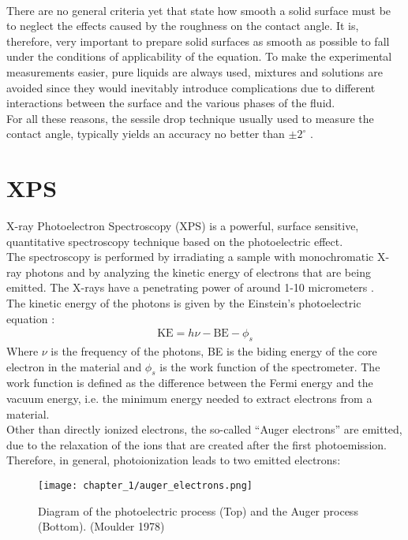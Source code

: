 \\
There are no general criteria yet that state how smooth a solid surface must be to neglect the effects caused by the roughness on the contact angle. It is, therefore, very important to prepare solid surfaces as smooth as possible to fall under the conditions of applicability of the equation. To make the experimental measurements easier, pure liquids are always used, mixtures and solutions are avoided since they would inevitably introduce complications due to different interactions between the surface and the various phases of the fluid.
\\
For all these reasons, the sessile drop technique usually used to measure the contact angle, typically yields an accuracy no better than $\pm 2^\circ$ \cite{kwokContactAngleMeasurement1999}.

\section{XPS}
\label{sec:xps}
X-ray Photoelectron Spectroscopy (XPS) is a powerful, surface sensitive, quantitative spectroscopy technique based on the photoelectric effect.
\\
The spectroscopy is performed by irradiating a sample with monochromatic X-ray photons and by analyzing the kinetic energy of electrons that are being emitted. The X-rays have a penetrating power of around 1-10 micrometers \cite{moulderHandbookXrayPhotoelectron1992}.
\\
The kinetic energy of the photons is given by the Einstein's photoelectric equation \cite{einsteinHeuristicPointView1967}:
\begin{align}
    \mathrm{KE}=h\nu-\mathrm{BE}-\phi_s \label{eq:einstein_ph_eq}
\end{align}
Where $\nu$ is the frequency of the photons, BE is the biding energy of the core electron in the material and $\phi_s$ is the work function of the spectrometer. The work function is defined as the difference between the Fermi energy and the vacuum energy, i.e. the minimum energy needed to extract electrons from a material. 
\\
Other than directly ionized electrons, the so-called “Auger electrons” \cite{augerAugerEffect1975} are emitted, due to the relaxation of the ions that are created after the first photoemission. Therefore, in general, photoionization leads to two emitted electrons:
\begin{figure}[H]
    \centering
    \texttt{[image: chapter\_1/auger\_electrons.png]}
    \vspace*{0pt}
    \caption{Diagram of the photoelectric process (Top) and the Auger process (Bottom). (Moulder 1978)}
    \label{fig:auger_photoelectric}
\end{figure}

